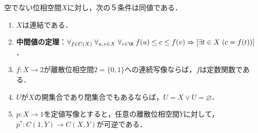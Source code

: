 \documentclass[uplatex,dvipdfmx]{jsreport}
\begin{document}
\begin{proposition}\label{prop-charactorization-of-connectedness}
    空でない位相空間$X$に対し，次の５条件は同値である．
    \begin{enumerate}
        \item $X$は連結である．
        \item \textbf{中間値の定理}：$\forall_{f\in C(X)}\;\forall_{u,v\in X}\;\forall_{c\in\R}\;f(u)\le c\le f(v)\Rightarrow[\exists t\in X\;(c=f(t))]$．
        \item $f:X\to 2$が離散位相空間$2=\{0,1\}$への連続写像ならば，$f$は定数関数である．
        \item $U$が$X$の開集合であり閉集合でもあるならば，$U=X\lor U=\varnothing$．
        \item $p:X\to 1$を定値写像とすると，任意の離散位相空間$Y$に対して，$p^*:C(1,Y)\to C(X,Y)$が可逆である．
    \end{enumerate}
\end{proposition}
\end{document}

